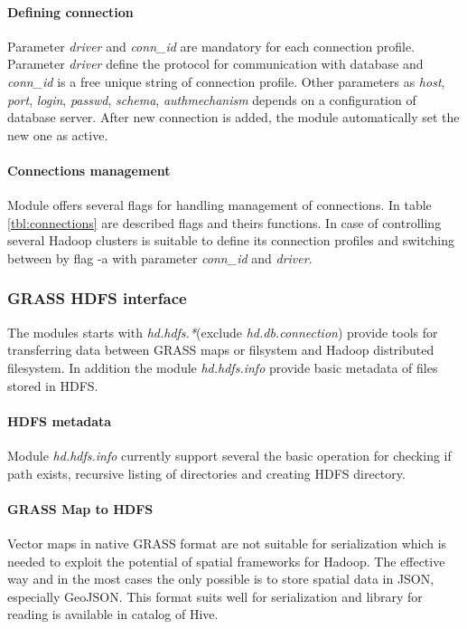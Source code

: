 \documentclass[a4paper,12pt,oneside]{report}
\begin{document}
    \paragraph{Defining connection} Parameter \textit{driver} and \textit{conn\_id}
    are mandatory for each connection profile. Parameter \textit{driver} define the
    protocol for communication with database and  \textit{conn\_id} is a free
    unique string of connection profile. Other parameters as \textit{host},
    \textit{port}, \textit{login}, \textit{passwd}, \textit{schema},
    \textit{authmechanism} depends on a configuration of database server. After new
    connection is added, the module automatically set the new one as active. 
    
    \paragraph{Connections management} Module offers several flags for handling
    management of connections. In table \ref{tbl:connections} are described flags and
    theirs functions. In case of controlling several Hadoop clusters is suitable 
    to define its connection profiles and switching between by flag -a with parameter
    \textit{conn\_id} and \textit{driver}.
    

    \subsubsection{GRASS HDFS interface}
    The modules starts with \textit{hd.hdfs.*}(exclude \textit{hd.db.connection})
    provide tools for transferring data between GRASS maps or filsystem and Hadoop
    distributed filesystem. In addition the module \textit{hd.hdfs.info} provide basic
    metadata of files stored in HDFS.
    
    \paragraph{HDFS metadata} Module \textit{hd.hdfs.info} currently support several
    the basic operation for checking if path exists, recursive listing of directories and
    creating HDFS directory.
    
    
    \paragraph{GRASS Map to HDFS} Vector maps in native GRASS format are not
    suitable for serialization which is needed to exploit the potential of
    spatial frameworks for Hadoop. The effective way and in the most cases the only
    possible is to store spatial data in JSON, especially GeoJSON. This format suits well  for serialization and library for reading is available in 
    catalog of Hive. 
    
\end{document}
